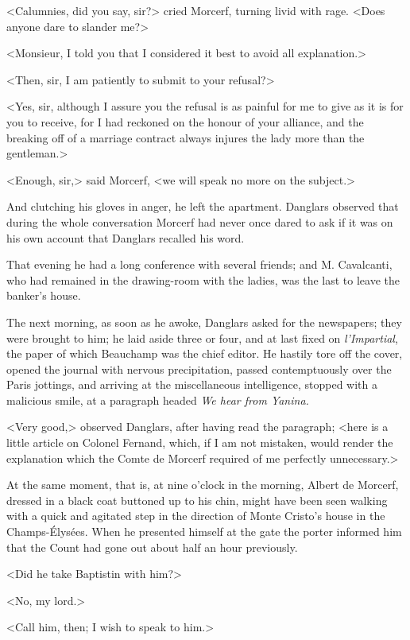  <Calumnies, did you say, sir?> cried Morcerf, turning livid with rage. <Does anyone dare to slander me?> 

 <Monsieur, I told you that I considered it best to avoid all explanation.> 

 <Then, sir, I am patiently to submit to your refusal?> 

 <Yes, sir, although I assure you the refusal is as painful for me to give as it is for you to receive, for I had reckoned on the honour of your alliance, and the breaking off of a marriage contract always injures the lady more than the gentleman.> 

 <Enough, sir,> said Morcerf, <we will speak no more on the subject.> 

 And clutching his gloves in anger, he left the apartment. Danglars observed that during the whole conversation Morcerf had never once dared to ask if it was on his own account that Danglars recalled his word. 

 That evening he had a long conference with several friends; and M. Cavalcanti, who had remained in the drawing-room with the ladies, was the last to leave the banker's house. 

 The next morning, as soon as he awoke, Danglars asked for the newspapers; they were brought to him; he laid aside three or four, and at last fixed on \textit{l'Impartial}, the paper of which Beauchamp was the chief editor. He hastily tore off the cover, opened the journal with nervous precipitation, passed contemptuously over the Paris jottings, and arriving at the miscellaneous intelligence, stopped with a malicious smile, at a paragraph headed \textit{We hear from Yanina.}

 <Very good,> observed Danglars, after having read the paragraph; <here is a little article on Colonel Fernand, which, if I am not mistaken, would render the explanation which the Comte de Morcerf required of me perfectly unnecessary.> 

 At the same moment, that is, at nine o'clock in the morning, Albert de Morcerf, dressed in a black coat buttoned up to his chin, might have been seen walking with a quick and agitated step in the direction of Monte Cristo's house in the Champs-Élysées. When he presented himself at the gate the porter informed him that the Count had gone out about half an hour previously. 

 <Did he take Baptistin with him?> 

 <No, my lord.> 

 <Call him, then; I wish to speak to him.> 

